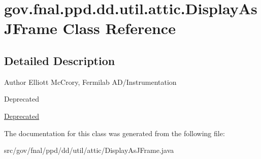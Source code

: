 \hypertarget{classgov_1_1fnal_1_1ppd_1_1dd_1_1util_1_1attic_1_1DisplayAsJFrame}{\section{gov.\-fnal.\-ppd.\-dd.\-util.\-attic.\-Display\-As\-J\-Frame Class Reference}
\label{classgov_1_1fnal_1_1ppd_1_1dd_1_1util_1_1attic_1_1DisplayAsJFrame}
}


\subsection{Detailed Description}
\begin{DoxyAuthor}{Author}
Elliott Mc\-Crory, Fermilab A\-D/\-Instrumentation 
\end{DoxyAuthor}
\begin{DoxyRefDesc}{Deprecated}
\item[\hyperlink{deprecated__deprecated000008}{Deprecated}]\end{DoxyRefDesc}


The documentation for this class was generated from the following file\-:\begin{DoxyCompactItemize}
\item 
src/gov/fnal/ppd/dd/util/attic/Display\-As\-J\-Frame.\-java\end{DoxyCompactItemize}
